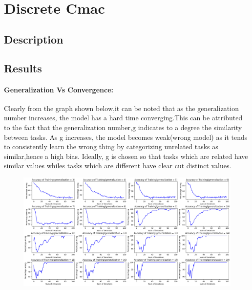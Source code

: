 \documentclass{article}
\begin{document}
\section{Discrete Cmac}
\subsection{Description}
\subsection{Results}
  \paragraph{Generalization Vs Convergence:}
   Clearly from the graph shown below,it can be noted that  
  as the generalization number increases, the model has a hard time converging.This can
  be attributed to the fact that the generalization number,g indicates to a degree the similarity
  between tasks. As g increases, the model becomes weak(wrong model) as it tends to consistently learn the wrong thing by categorizing unrelated tasks 
  as similar,hence a high bias. Ideally, g is chosen so that tasks which are related have similar values whiles tasks
  which are different have clear cut distinct values. 
  \begin{figure}[h!]
    \includegraphics[scale=0.35]{./Results/convergenceVsgeneralization.png}
  \end{figure}
\end{document}
